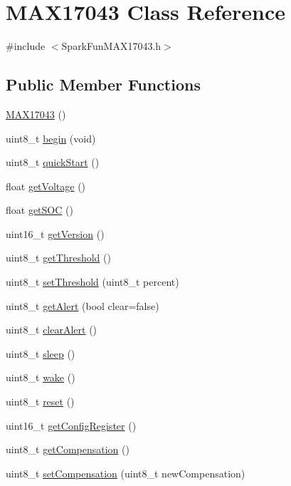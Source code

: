 \hypertarget{class_m_a_x17043}{}\section{M\+A\+X17043 Class Reference}
\label{class_m_a_x17043}


{\ttfamily \#include $<$Spark\+Fun\+M\+A\+X17043.\+h$>$}

\subsection*{Public Member Functions}
\begin{DoxyCompactItemize}
\item 
\hyperlink{class_m_a_x17043_a355bb280e2fb71a761ac539c5d6b335a}{M\+A\+X17043} ()
\item 
uint8\+\_\+t \hyperlink{class_m_a_x17043_a7f434b44531c65f4a3b31c4f5ebcb887}{begin} (void)
\item 
uint8\+\_\+t \hyperlink{class_m_a_x17043_a853dbf7908a1c4a37405050ec5e9c9e6}{quick\+Start} ()
\item 
float \hyperlink{class_m_a_x17043_afcba3e7ee660335c78995d337cab1678}{get\+Voltage} ()
\item 
float \hyperlink{class_m_a_x17043_a9567ba1006631e2d262a01ced542523f}{get\+S\+OC} ()
\item 
uint16\+\_\+t \hyperlink{class_m_a_x17043_acca2d36ef6359c085c9fe8bf2eb37ec3}{get\+Version} ()
\item 
uint8\+\_\+t \hyperlink{class_m_a_x17043_a79f404146d8ad9a0da8e1941f99ab6a1}{get\+Threshold} ()
\item 
uint8\+\_\+t \hyperlink{class_m_a_x17043_a1399c759fa7039420a2ac324db843a1f}{set\+Threshold} (uint8\+\_\+t percent)
\item 
uint8\+\_\+t \hyperlink{class_m_a_x17043_ab62ceb6112cf661a9ca4ffa54d4e72c5}{get\+Alert} (bool clear=false)
\item 
uint8\+\_\+t \hyperlink{class_m_a_x17043_a396806dcd5feff73dfea335a75d2476e}{clear\+Alert} ()
\item 
uint8\+\_\+t \hyperlink{class_m_a_x17043_ac284bdd3085b45246cc115f2c58dea5f}{sleep} ()
\item 
uint8\+\_\+t \hyperlink{class_m_a_x17043_a3362df7c61d7a9acf75d1ee83f219b1f}{wake} ()
\item 
uint8\+\_\+t \hyperlink{class_m_a_x17043_a29130068805144281ce44dc686e8ef1e}{reset} ()
\item 
uint16\+\_\+t \hyperlink{class_m_a_x17043_ac9e3d5347ba744323ddcc973d89c15ad}{get\+Config\+Register} ()
\item 
uint8\+\_\+t \hyperlink{class_m_a_x17043_a644fb0b3b44c57e2d58faeb8190e82cd}{get\+Compensation} ()
\item 
uint8\+\_\+t \hyperlink{class_m_a_x17043_a0e65f026d006cd020439329e7230d7c5}{set\+Compensation} (uint8\+\_\+t new\+Compensation)
\end{DoxyCompactItemize}


